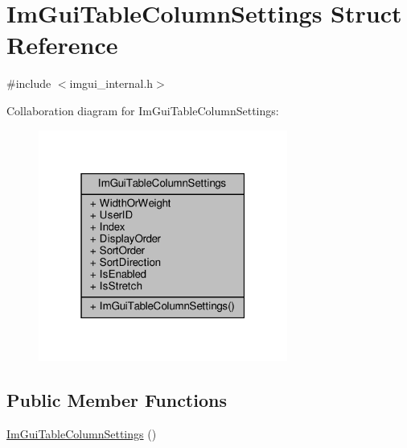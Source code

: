 \hypertarget{structImGuiTableColumnSettings}{}\section{Im\+Gui\+Table\+Column\+Settings Struct Reference}
\label{structImGuiTableColumnSettings}


{\ttfamily \#include $<$imgui\+\_\+internal.\+h$>$}



Collaboration diagram for Im\+Gui\+Table\+Column\+Settings\+:
\nopagebreak
\begin{figure}[H]
\begin{center}
\leavevmode
\includegraphics[width=232pt]{structImGuiTableColumnSettings__coll__graph}
\end{center}
\end{figure}
\subsection*{Public Member Functions}
\begin{DoxyCompactItemize}
\item 
\hyperlink{structImGuiTableColumnSettings_ac45c9010562d52674cce08cf2cc41568}{Im\+Gui\+Table\+Column\+Settings} ()
\end{DoxyCompactItemize}
